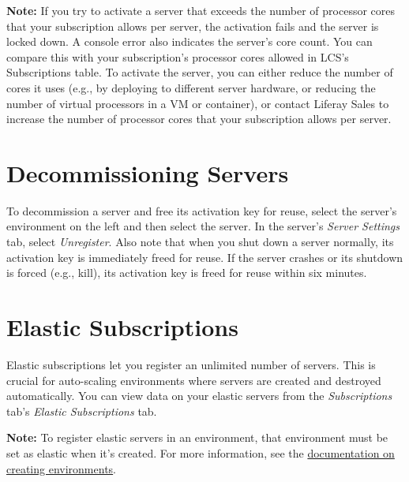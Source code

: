 \noindent\hrulefill

\noindent\hrulefill

\textbf{Note:} If you try to activate a server that exceeds the number
of processor cores that your subscription allows per server, the
activation fails and the server is locked down. A console error also
indicates the server's core count. You can compare this with your
subscription's processor cores allowed in LCS's Subscriptions table. To
activate the server, you can either reduce the number of cores it uses
(e.g., by deploying to different server hardware, or reducing the number
of virtual processors in a VM or container), or contact Liferay Sales to
increase the number of processor cores that your subscription allows per
server.

\noindent\hrulefill

\section{Decommissioning Servers}\label{decommissioning-servers}

To decommission a server and free its activation key for reuse, select
the server's environment on the left and then select the server. In the
server's \emph{Server Settings} tab, select \emph{Unregister}. Also note
that when you shut down a server normally, its activation key is
immediately freed for reuse. If the server crashes or its shutdown is
forced (e.g., kill), its activation key is freed for reuse within six
minutes.

\section{Elastic Subscriptions}\label{elastic-subscriptions}

Elastic subscriptions let you register an unlimited number of servers.
This is crucial for auto-scaling environments where servers are created
and destroyed automatically. You can view data on your elastic servers
from the \emph{Subscriptions} tab's \emph{Elastic Subscriptions} tab.

\noindent\hrulefill

\textbf{Note:} To register elastic servers in an environment, that
environment must be set as elastic when it's created. For more
information, see the
\href{/docs/7-2/deploy/-/knowledge_base/d/managing-lcs-environments\#creating-environments}{documentation
on creating environments}.

\noindent\hrulefill

